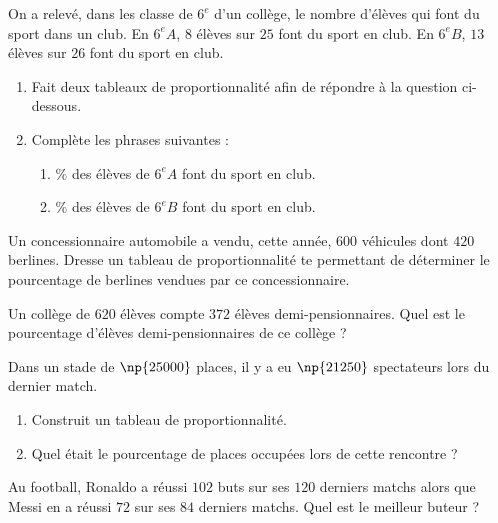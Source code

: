 \documentclass[a4paper,10pt]{report}
\begin{document}
\begin{ex}
On a relevé, dans les classe de $6^e$ d'un collège, le nombre d'élèves qui font du sport dans un club. En $6^e A$, $8$ élèves sur $25$ font du sport en club. En $6^e B$, $13$ élèves sur $26$ font du sport en club.

\begin{enumerate}[font=\color{exer1}]
\item Fait deux tableaux de proportionnalité afin de répondre à la question ci-dessous.
\item Complète les phrases suivantes :

\medskip
\begin{enumerate}[font=\color{exer1}]
\item[•] \dotfill $\%$ des élèves de $6^e A$ font du sport en club.\medskip
\item[•] \dotfill $\%$ des élèves de $6^e B$ font du sport en club.
\end{enumerate}
\end{enumerate}
\end{ex}

\begin{ex}
Un concessionnaire automobile a vendu, cette année, $600$ véhicules dont $420$ berlines. Dresse un tableau de proportionnalité te permettant de déterminer le pourcentage de berlines vendues par ce concessionnaire.
\end{ex}

\begin{ex}
Un collège de $620$ élèves compte $372$ élèves demi-pensionnaires. Quel est le pourcentage d'élèves demi-pensionnaires de ce collège ?
\end{ex}

\begin{ex}
Dans un stade de $\np{25000}$ places, il y a eu $\np{21250}$ spectateurs lors du dernier match.
\begin{enumerate}[font=\color{exer1}]
\item Construit un tableau de proportionnalité.
\item Quel était le pourcentage de places occupées lors de cette rencontre ?
\end{enumerate}
\end{ex}

\begin{ex}
Au football, Ronaldo a réussi $102$ buts sur ses $120$ derniers matchs alors que Messi en a réussi $72$ sur ses $84$ derniers matchs. Quel est le meilleur buteur ?
\end{ex}
\end{document}
